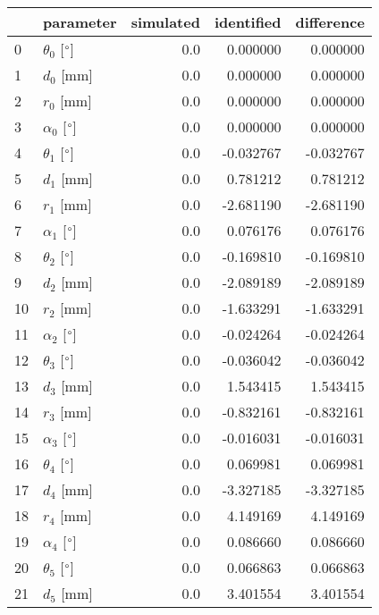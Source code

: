 \documentclass{standalone}%
\begin{document}
%
\normalsize%
\begin{tabular}{llrrr}
\toprule
{} &                 parameter & simulated & identified & difference \\
\midrule
0  &  $\theta_{0}$ [$\degree$] &       0.0 &   0.000000 &   0.000000 \\
1  &              $d_{0}$ [mm] &       0.0 &   0.000000 &   0.000000 \\
2  &              $r_{0}$ [mm] &       0.0 &   0.000000 &   0.000000 \\
3  &  $\alpha_{0}$ [$\degree$] &       0.0 &   0.000000 &   0.000000 \\
4  &  $\theta_{1}$ [$\degree$] &       0.0 &  -0.032767 &  -0.032767 \\
5  &              $d_{1}$ [mm] &       0.0 &   0.781212 &   0.781212 \\
6  &              $r_{1}$ [mm] &       0.0 &  -2.681190 &  -2.681190 \\
7  &  $\alpha_{1}$ [$\degree$] &       0.0 &   0.076176 &   0.076176 \\
8  &  $\theta_{2}$ [$\degree$] &       0.0 &  -0.169810 &  -0.169810 \\
9  &              $d_{2}$ [mm] &       0.0 &  -2.089189 &  -2.089189 \\
10 &              $r_{2}$ [mm] &       0.0 &  -1.633291 &  -1.633291 \\
11 &  $\alpha_{2}$ [$\degree$] &       0.0 &  -0.024264 &  -0.024264 \\
12 &  $\theta_{3}$ [$\degree$] &       0.0 &  -0.036042 &  -0.036042 \\
13 &              $d_{3}$ [mm] &       0.0 &   1.543415 &   1.543415 \\
14 &              $r_{3}$ [mm] &       0.0 &  -0.832161 &  -0.832161 \\
15 &  $\alpha_{3}$ [$\degree$] &       0.0 &  -0.016031 &  -0.016031 \\
16 &  $\theta_{4}$ [$\degree$] &       0.0 &   0.069981 &   0.069981 \\
17 &              $d_{4}$ [mm] &       0.0 &  -3.327185 &  -3.327185 \\
18 &              $r_{4}$ [mm] &       0.0 &   4.149169 &   4.149169 \\
19 &  $\alpha_{4}$ [$\degree$] &       0.0 &   0.086660 &   0.086660 \\
20 &  $\theta_{5}$ [$\degree$] &       0.0 &   0.066863 &   0.066863 \\
21 &              $d_{5}$ [mm] &       0.0 &   3.401554 &   3.401554 \\

\end{tabular}
\end{document}
